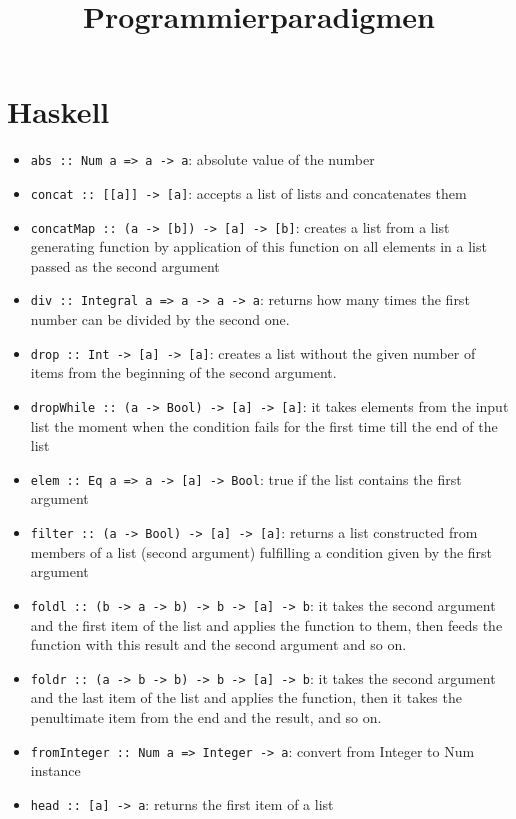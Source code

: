 \documentclass[11pt]{scrartcl}
\title{Programmierparadigmen}
\date{\vspace{-5ex}}
\begin{document}
\maketitle

\section{Haskell}

\begin{itemize}
    \item \texttt{abs :: Num a => a -> a}: absolute value of the number
    \item \texttt{concat :: [[a]] -> [a]}: accepts a list of lists and concatenates them
    \item \texttt{concatMap :: (a -> [b]) -> [a] -> [b]}: creates a list from a list 
    generating function by application of this function on all elements in a list passed as 
    the second argument
    \item \texttt{div :: Integral a => a -> a -> a}: returns how many times the first number 
    can be divided by the second one.
    \item \texttt{drop :: Int -> [a] -> [a]}: creates a list without the given number of items 
    from the beginning of the second argument.
    \item \texttt{dropWhile :: (a -> Bool) -> [a] -> [a]}: it takes elements from the input 
    list the moment when the condition fails for the first time till the end of the list
    \item \texttt{elem :: Eq a => a -> [a] -> Bool}: true if the list contains the first 
    argument
    \item \texttt{filter :: (a -> Bool) -> [a] -> [a]}: returns a list constructed from 
    members of a list (second argument) fulfilling a condition given by the first argument
    \item \texttt{foldl :: (b -> a -> b) -> b -> [a] -> b}: it takes the second argument and 
    the first item of the list and applies the function to them, then feeds the function with 
    this result and the second argument and so on.
    \item \texttt{foldr :: (a -> b -> b) -> b -> [a] -> b}: it takes the second argument and 
    the last item of the list and applies the function, then it takes the penultimate item 
    from the end and the result, and so on.
    \item \texttt{fromInteger :: Num a => Integer -> a}: convert from Integer to Num instance
    \item \texttt{head :: [a] -> a}: returns the first item of a list

\end{itemize}
\end{document}
